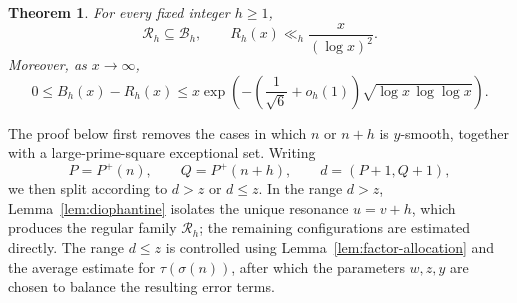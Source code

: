 \documentclass[11pt,reqno]{amsart}
\numberwithin{equation}{section}
\theoremstyle{plain}
\newtheorem{theorem}{Theorem}[section]
\theoremstyle{definition}
\theoremstyle{remark}
\begin{document}
\begin{theorem}\label{thm:regular-decomposition}
For every fixed integer $h\ge1$,
\[
\mathcal R_h\subseteq\mathcal B_h,
\qquad
R_h(x)\ll_h\frac{x}{(\log x)^2}.
\]
Moreover, as $x\to\infty$,
\begin{equation}\label{eq:regular-remainder}
0\le B_h(x)-R_h(x)
\le
x\exp\!\left(
-\left(\frac1{\sqrt6}+o_h(1)\right)
\sqrt{\log x\,\log\log x}
\right).
\end{equation}
\end{theorem}

The proof below first removes the cases in which $n$ or $n+h$ is $y$-smooth, together with a large-prime-square exceptional set. Writing
\[
P=P^+(n),\qquad Q=P^+(n+h),\qquad d=(P+1,Q+1),
\]
we then split according to $d>z$ or $d\le z$. In the range $d>z$, Lemma~\ref{lem:diophantine} isolates the unique resonance $u=v+h$, which produces the regular family $\mathcal R_h$; the remaining configurations are estimated directly. The range $d\le z$ is controlled using Lemma~\ref{lem:factor-allocation} and the average estimate for $\tau(\sigma(n))$, after which the parameters $w,z,y$ are chosen to balance the resulting error terms.
\end{document}
